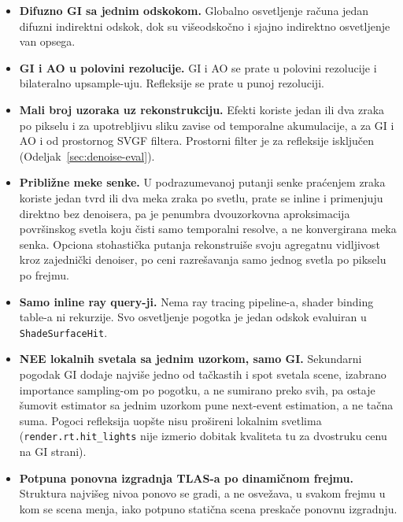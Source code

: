 \begin{itemize}
  \item \textbf{Difuzno GI sa jednim odskokom.} Globalno osvetljenje ra\v{c}una jedan difuzni indirektni odskok, dok su vi\v{s}eodsko\v{c}no i sjajno indirektno osvetljenje van opsega.
  \item \textbf{GI i AO u polovini rezolucije.} GI i AO se prate u polovini rezolucije i bilateralno upsample-uju. Refleksije se prate u punoj rezoluciji.
  \item \textbf{Mali broj uzoraka uz rekonstrukciju.} Efekti koriste jedan ili dva zraka po pikselu i za upotrebljivu sliku zavise od temporalne akumulacije, a za GI i AO i od prostornog SVGF filtera. Prostorni filter je za refleksije isklju\v{c}en (Odeljak~\ref{sec:denoise-eval}).
  \item \textbf{Pribli\v{z}ne meke senke.} U podrazumevanoj putanji senke pra\'cenjem zraka koriste jedan tvrd ili dva meka zraka po svetlu, prate se inline i primenjuju direktno bez denoisera, pa je penumbra dvouzorkovna aproksimacija povr\v{s}inskog svetla koju \v{c}isti samo temporalni resolve, a ne konvergirana meka senka. Opciona stohasti\v{c}ka putanja rekonstrui\v{s}e svoju agregatnu vidljivost kroz zajedni\v{c}ki denoiser, po ceni razre\v{s}avanja samo jednog svetla po pikselu po frejmu.
  \item \textbf{Samo inline ray query-ji.} Nema ray tracing pipeline-a, shader binding table-a ni rekurzije. Svo osvetljenje pogotka je jedan odskok evaluiran u \texttt{ShadeSurfaceHit}.
  \item \textbf{NEE lokalnih svetala sa jednim uzorkom, samo GI.} Sekundarni pogodak GI dodaje najvi\v{s}e jedno od ta\v{c}kastih i spot svetala scene, izabrano importance sampling-om po pogotku, a ne sumirano preko svih, pa ostaje \v{s}umovit estimator sa jednim uzorkom pune next-event estimation, a ne ta\v{c}na suma. Pogoci refleksija uop\v{s}te nisu pro\v{s}ireni lokalnim svetlima (\texttt{render.rt.hit_lights} nije izmerio dobitak kvaliteta tu za dvostruku cenu na GI strani).
  \item \textbf{Potpuna ponovna izgradnja TLAS-a po dinami\v{c}nom frejmu.} Struktura najvi\v{s}eg nivoa ponovo se gradi, a ne osve\v{z}ava, u svakom frejmu u kom se scena menja, iako potpuno stati\v{c}na scena preska\v{c}e ponovnu izgradnju.
\end{itemize}
